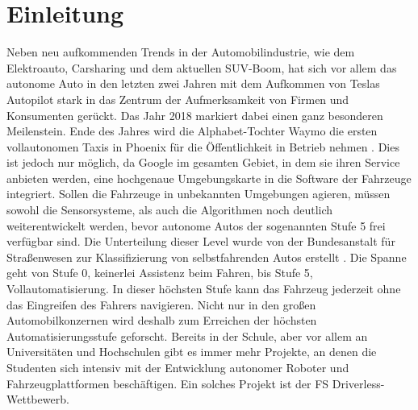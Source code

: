 \documentclass{like}
\begin{document}
  








\setcounter{page}{1}   %

\chapter{Einleitung}
Neben neu aufkommenden Trends in der Automobilindustrie, wie dem Elektroauto, Carsharing und dem aktuellen SUV-Boom, hat sich vor allem das autonome Auto in den letzten zwei Jahren mit dem Aufkommen von Teslas Autopilot stark in das Zentrum der Aufmerksamkeit von Firmen und Konsumenten gerückt. Das Jahr 2018 markiert dabei einen ganz besonderen Meilenstein. 
Ende des Jahres wird die Alphabet-Tochter Waymo die ersten vollautonomen Taxis in Phoenix für die Öffentlichkeit in Betrieb nehmen \cite{Waymo:1}. 
Dies ist jedoch nur möglich, da Google im gesamten Gebiet, in dem sie ihren Service anbieten werden, eine hochgenaue Umgebungskarte in die Software der Fahrzeuge integriert. Sollen die Fahrzeuge in unbekannten Umgebungen agieren, müssen sowohl die Sensorsysteme, als auch die Algorithmen noch deutlich weiterentwickelt werden, bevor autonome Autos der sogenannten Stufe 5 frei verfügbar sind. Die Unterteilung dieser Level wurde von der Bundesanstalt für Straßenwesen zur Klassifizierung von selbstfahrenden Autos erstellt \cite{BASt5L}. Die Spanne geht von Stufe 0, keinerlei Assistenz beim Fahren, bis Stufe 5, Vollautomatisierung. In dieser höchsten Stufe kann das Fahrzeug jederzeit ohne das Eingreifen des Fahrers navigieren. 
Nicht nur in den großen Automobilkonzernen wird deshalb zum Erreichen der höchsten Automatisierungsstufe geforscht. Bereits in der Schule, aber vor allem an Universitäten und Hochschulen gibt es immer mehr Projekte, an denen die Studenten sich intensiv mit der Entwicklung autonomer Roboter und Fahrzeugplattformen beschäftigen. Ein solches Projekt ist der \ac{FS} Driverless-Wettbewerb.
\end{document}
